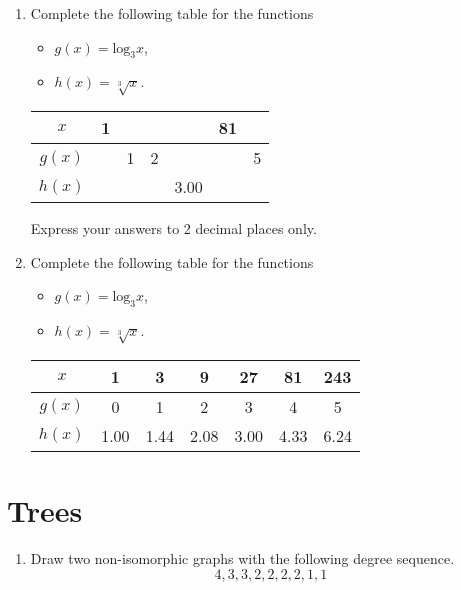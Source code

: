 \documentclass[]{article}
\begin{document}
\begin{enumerate}
\item Complete the following table for the functions 
\begin{itemize}
\item $g(x) = \mbox{log}_3x$,
\item $h(x) =\sqrt[3]{x}$.
\end{itemize} 
\begin{center}

\begin{tabular}{|c||c|c|c|c|c|c|}
\hline $x$ &  \phantom{p}1\phantom{p}&  &  &  & 81 &  \\ 
\hline \phantom{p} $g(x)$ \phantom{p}&  & \phantom{p}1\phantom{p} & \phantom{p}2\phantom{p} &  &  &  \phantom{p}5\phantom{p} \\ 
\hline \phantom{p}$h(x)$ \phantom{p}&  &  &  &  3.00 & \phantom{p}\phantom{p}\phantom{p}  &  \\ 
\hline 
\end{tabular} 
\end{center}

Express your answers to 2 decimal places only.



\item 
Complete the following table for the functions 
\begin{itemize}
\item $g(x) = \mbox{log}_3x$,
\item $h(x) =\sqrt[3]{x}$.
\end{itemize} 
\begin{center}

\begin{tabular}{|c||c|c|c|c|c|c|}
\hline $x$ & 1	&	3	&	9	&	27	&	81	&	243	\\ \hline
\phantom{p} $g(x)$ \phantom{p}&0	&	1	&	2	&	3	&	4	&	5	\\ \hline
\phantom{p}$h(x)$ \phantom{p}&  1.00	&	1.44	&	2.08	&	3.00	&	4.33	&	6.24	\\ \hline
\end{tabular} 
\end{center}


\end{enumerate}
\section*{Trees}
\begin{enumerate}
\item Draw two non-isomorphic graphs with the following degree sequence.
\[ 4,3,3,2,2,2,2,1,1\]
\end{enumerate}
\end{document}

